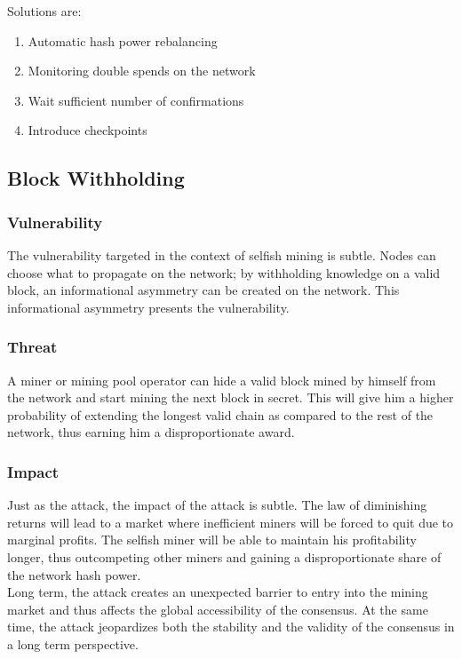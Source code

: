 \documentclass[11pt,a4paper,draft]{article}
\begin{document}
Solutions are:
\begin{enumerate}
  \item Automatic hash power rebalancing
  \item Monitoring double spends on the network
  \item Wait sufficient number of confirmations
  \item Introduce checkpoints
\end{enumerate}

\subsection{Block Withholding}

\subsubsection{Vulnerability}

The vulnerability targeted in the context of selfish mining is subtle. Nodes can choose what to propagate on the network; by withholding knowledge on a valid block, an informational asymmetry can be created on the network. This informational asymmetry presents the vulnerability.\\

\subsubsection{Threat}

A miner or mining pool operator can hide a valid block mined by himself from the network and start mining the next block in secret. This will give him a higher probability of extending the longest valid chain as compared to the rest of the network, thus earning him a disproportionate award.\\

\subsubsection{Impact}

Just as the attack, the impact of the attack is subtle. The law of diminishing returns will lead to a market where inefficient miners will be forced to quit due to marginal profits. The selfish miner will be able to maintain his profitability longer, thus outcompeting other miners and gaining a disproportionate share of the network hash power.\\

Long term, the attack creates an unexpected barrier to entry into the mining market and thus affects the global accessibility of the consensus. At the same time, the attack jeopardizes both the stability and the validity of the consensus in a long term perspective.\\
\end{document}
